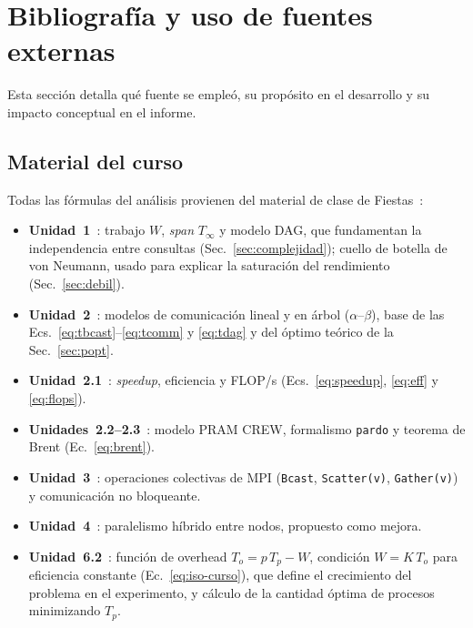 \documentclass[11pt,a4paper]{article}
\begin{document}
\section{Bibliografía y uso de fuentes externas}
Esta sección detalla qué fuente se empleó, su propósito en el desarrollo y su impacto conceptual en
el informe.

\subsection{Material del curso}
Todas las fórmulas del análisis provienen del material de clase de
Fiestas~\cite{fiestasU1,fiestasU2,fiestasU21,fiestasU22,fiestasU3,fiestasU4,fiestasU62}:
\begin{itemize}
  \item \textbf{Unidad~1}~\cite{fiestasU1}: trabajo $W$, \emph{span} $T_\infty$ y modelo DAG, que
        fundamentan la independencia entre consultas (Sec.~\ref{sec:complejidad}); cuello de botella
        de von Neumann, usado para explicar la saturación del rendimiento (Sec.~\ref{sec:debil}).
  \item \textbf{Unidad~2}~\cite{fiestasU2}: modelos de comunicación lineal y en árbol
        ($\alpha$--$\beta$), base de las Ecs.~\eqref{eq:tbcast}--\eqref{eq:tcomm} y \eqref{eq:tdag}
        y del óptimo teórico de la Sec.~\ref{sec:popt}.
  \item \textbf{Unidad~2.1}~\cite{fiestasU21}: \emph{speedup}, eficiencia y FLOP/s
        (Ecs.~\eqref{eq:speedup}, \eqref{eq:eff} y \eqref{eq:flops}).
  \item \textbf{Unidades~2.2--2.3}~\cite{fiestasU22}: modelo PRAM CREW, formalismo \texttt{pardo} y
        teorema de Brent (Ec.~\eqref{eq:brent}).
  \item \textbf{Unidad~3}~\cite{fiestasU3}: operaciones colectivas de MPI (\texttt{Bcast},
        \texttt{Scatter(v)}, \texttt{Gather(v)}) y comunicación no bloqueante.
  \item \textbf{Unidad~4}~\cite{fiestasU4}: paralelismo híbrido entre nodos, propuesto como mejora.
  \item \textbf{Unidad~6.2}~\cite{fiestasU62}: función de overhead $T_o=p\,T_p-W$, condición
        $W=K\,T_o$ para eficiencia constante (Ec.~\eqref{eq:iso-curso}), que define el crecimiento
        del problema en el experimento, y cálculo de la cantidad óptima de procesos minimizando
        $T_p$.
\end{itemize}
\end{document}
